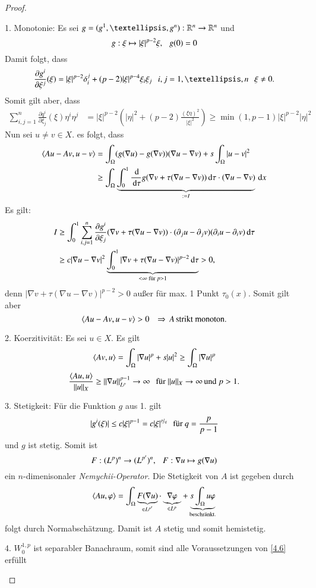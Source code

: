 \begin{proof}
    \begin{description}
    \item{1. Monotonie:}
    Es sei $g=(g^1,…,g^n):\R^n\ra \R^n$ und
    \[
        g:\xi \mapsto |\xi|^{p-2} \xi, \hspace{.25cm} g(0)=0  
    \]
    Damit folgt, dass
    \[
        \frac{\partial g^i}{\partial \xi^j}(\xi)=|\xi|^{p-2} \delta_i^j + (p-2)|\xi|^{p-4}\xi_i\xi_j
        \qq i,j=1,…,n \qq \xi\neq 0.
    \]
    Somit gilt aber, dass
    \begin{align*}
        \sum_{i,j=1}^n \frac{\partial q^i}{\partial \xi _j}(\xi) \eta^i\eta^j&= |\xi|^{p-2}
        \left( |\eta|^2+ (p-2)\frac{(\xi \eta)^2}{|\xi|^2} \right)
        \geq \min(1,p-1) |\xi|^{p-2} |\eta|^2
    \end{align*}
    Nun sei $u\neq v \in X.$ es folgt, dass
    \begin{align*}
        \langle Au-Av,u-v\rangle &= \int_\Omega (g(\nabla u)- g(\nabla v))(\nabla u - \nabla v) + s \int_\Omega
        |u-v|^2\\
            &\geq \int_\Omega \underbrace{\int_0^1 \frac{\, \mathrm{d}}{\, \mathrm{d} \tau} g(\nabla v + \tau(\nabla u -
                        \nabla v)) \, \mathrm{d}\tau\cdot(\nabla u-\nabla v)}_{:= I}  \, \mathrm{d} x\\
    \end{align*}
    Es gilt:
    \begin{align*}
        I&\geq \int_0^1 \sum_{i,j=1}^n\frac{\partial g^i}{\partial\xi_j}(\nabla v + \tau(\nabla u-\nabla v))
        \cdot (\partial_ju-\partial_jv)(\partial_iu-\partial_iv)\, \mathrm{d} \tau\\
        &\geq  c |\nabla u - \nabla v|^2\underbrace{\int_0^1 |\nabla v+\tau(\nabla u -\nabla v)|^{p-2}\, \mathrm{d}\tau}
        _{<\infty \text{ für }p>1} >0,
    \end{align*}
    denn $|\nabla v + \tau (\nabla u - \nabla v)|^{p-2}>0$ außer für max. 1 Punkt $\tau_0(x)$. Somit gilt
    aber
    \[
        \langle Au-Av, u-v \rangle >0 \hspace{.25cm} \Rightarrow \, A \, \text{strikt monoton.}
    \]
    \item{2. Koerzitivität:}
    Es sei $u\in X$. Es gilt
    \[
        \langle Av,u\rangle= \int_\Omega |\nabla u|^p + s|u|^2\geq \int_\Omega |\nabla u|^p
    \]
    \[
        \frac{\langle Au,u \rangle}{\|u\|_X} \geq \|\nabla u\|^{p-1}_{L^p} \rightarrow \infty \hspace{.25cm} \text{für }\|u\|_X
        \rightarrow \infty \, \text{und } p>1.
    \]
    \item{3. Stetigkeit:}
    Für die Funktion $g$ aus 1. gilt
    \[
        |g^i(\xi)|\leq c |\xi|^{p-1} = c |\xi|^{\nicefrac pq} \hspace{.25cm} \text{für } q=\frac{p}{p-1}
    \]
    und $g$ ist stetig. Somit ist 
    \[
        F:(L^p)^n\rightarrow (L^{p'})^n, \hspace{.25cm}  F:\nabla u \mapsto g(\nabla u)
    \]
    ein $n$-dimenisonaler \textit{Nemychii-Operator}. Die Stetigkeit von $A$ ist gegeben durch
    \[
        \langle Au,\varphi\rangle=\int_\Omega \underbrace{F(\nabla u)}_{\in L^{p'}} \cdot \underbrace{\nabla \varphi}
        _{\in L^p} +\underbrace{s\int_\Omega u \varphi}_{\text{beschränkt.}}
    \]
    folgt durch Normabschätzung. Damit ist $A$ stetig und somit hemistetig.
    \item{4.}
    $W_0^{1,p}$ ist separabler Banachraum, somit sind alle Voraussetzungen von \ref{4.6} erfüllt
    \end{description}
    \[ \]
\end{proof}
